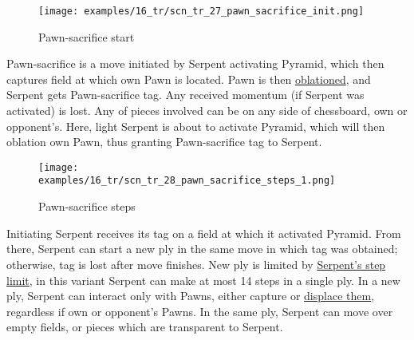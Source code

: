 \vspace*{-0.7\baselineskip}
\noindent
\begin{wrapfigure}[14]{l}{0.4\textwidth}
\centering
\texttt{[image: examples/16\_tr/scn\_tr\_27\_pawn\_sacrifice\_init.png]}
\vspace*{-0.4\baselineskip}
\caption{Pawn-sacrifice start}
\label{fig:scn_tr_27_pawn_sacrifice_init}
\end{wrapfigure}
Pawn-sacrifice is a move initiated by Serpent activating Pyramid, which then
captures field at which own Pawn is located. Pawn is then
\hyperref[sec:Terms/Oblation]{oblationed}, and Serpent gets Pawn-sacrifice
tag. Any received momentum (if Serpent was activated) is lost. Any of pieces
involved can be on any side of chessboard, own or opponent's.\newline
\indent
Here, light Serpent is about to activate Pyramid, which will then oblation
own Pawn, thus granting Pawn-sacrifice tag to Serpent.

\vspace*{0.7\baselineskip}
\noindent
\begin{wrapfigure}[17]{l}{0.4\textwidth}
\centering
\texttt{[image: examples/16\_tr/scn\_tr\_28\_pawn\_sacrifice\_steps\_1.png]}
\vspace*{-0.4\baselineskip}
\caption{Pawn-sacrifice steps}
\label{fig:scn_tr_28_pawn_sacrifice_steps_1}
\end{wrapfigure}
Initiating Serpent receives its tag on a field at which it activated Pyramid.
From there, Serpent can start a new ply in the same move in which tag was obtained;
otherwise, tag is lost after move finishes. New ply is limited by
\hyperref[fig:scn_tr_15_serpent_step_limit]{Serpent's step limit}, in this variant
Serpent can make at most 14 steps in a single ply.\newline
\indent
In a new ply, Serpent can interact only with Pawns, either capture or
\hyperref[fig:scn_tr_20_displacement_step_1]{displace them}, regardless if own or
opponent's Pawns. In the same ply, Serpent can move over empty fields, or pieces
which are transparent to Serpent.

\clearpage %

